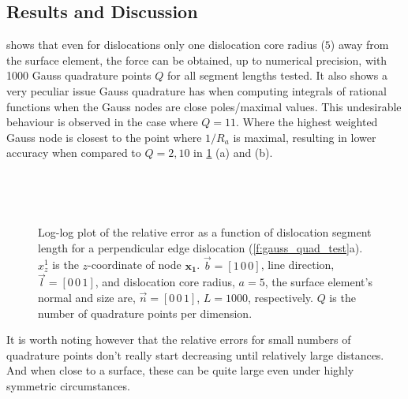\subsection{Results and Discussion}\label{ss:paperResults}

 shows that even for dislocations only one dislocation core radius ($5$) away from the surface element, the force can be obtained, up to numerical precision, with 1000 Gauss quadrature points $Q$ for all segment lengths tested. It also shows a very peculiar issue Gauss quadrature has when computing integrals of rational functions when the Gauss nodes are close poles/maximal values. This undesirable behaviour is observed in the case where $Q = 11$. Where the highest weighted Gauss node is closest to the point where $1/R_{a}$ is maximal, resulting in lower accuracy when compared to $Q = 2, 10$ in \cref{f:rel_err_perp_edge} (a) and (b).
\begin{figure}
    \centering
    ~

    ~
    \caption[Relative error for an edge dislocation perpendicular to a surface element.]{Log-log plot of the relative error as a function of dislocation segment length for a perpendicular edge dislocation (\cref{f:gauss_quad_test}a). $x^{1}_{z}$ is the $z$-coordinate of node $\mathbf{x_1}$. $\vec{b} = [1\, 0\, 0]$, line direction, $\vec{l} = [0\, 0\, 1]$, and dislocation core radius, $a = 5$, the surface element's normal and size are, $\vec{n} = [0\, 0\, 1]$, $L = 1000$, respectively. $Q$ is the number of quadrature points per dimension.}
    \label{f:rel_err_perp_edge}
\end{figure}
It is worth noting however that the relative errors for small numbers of quadrature points don't really start decreasing until relatively large distances. And when close to a surface, these can be quite large even under highly symmetric circumstances.

